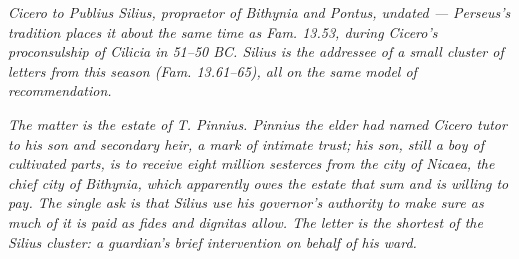 
\textit{Cicero to Publius Silius, propraetor of Bithynia and
Pontus, undated --- Perseus's tradition places it about the
same time as \textit{Fam.} 13.53, during Cicero's
proconsulship of Cilicia in 51--50 BC. Silius is the
addressee of a small cluster of letters from this season
(\textit{Fam.} 13.61--65), all on the same model of
recommendation.}

\textit{The matter is the estate of T. Pinnius. Pinnius the
elder had named Cicero \textit{tutor} to his son and
secondary heir, a mark of intimate trust; his son, still a
boy of cultivated parts, is to receive eight million
sesterces from the city of Nicaea, the chief city of
Bithynia, which apparently owes the estate that sum and is
willing to pay. The single ask is that Silius use his
governor's authority to make sure as much of it is paid as
\textit{fides} and \textit{dignitas} allow. The letter is
the shortest of the Silius cluster: a guardian's brief
intervention on behalf of his ward.}
